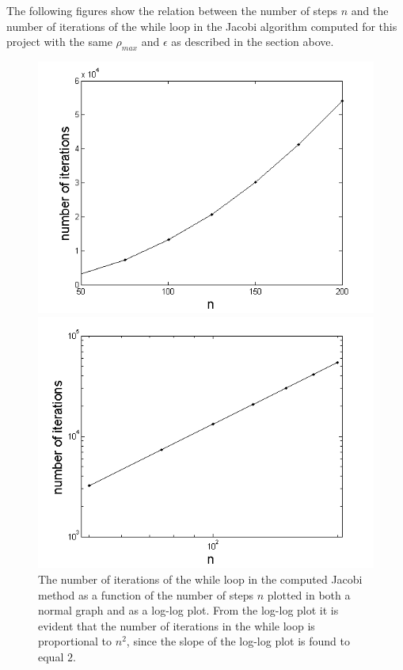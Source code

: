 The following figures show the relation between the number of steps $n$ and the number of iterations of the while loop in the Jacobi algorithm computed for this project with the same $\rho_{max}$ and $\epsilon$ as described in the section above.
\begin{figure}[H]
\centering
\begin{minipage}{.5\textwidth}
  \centering
  \includegraphics[width=1\linewidth]{figures/NumberOfIterations.png}
\end{minipage}%
\begin{minipage}{.5\textwidth}
  \centering
  \includegraphics[width=1\linewidth]{figures/NumberOfIterationsloglog.png}
\end{minipage}
\caption{The number of iterations of the while loop in the computed Jacobi method as a function of the number of steps $n$ plotted in both a normal graph and as a log-log plot. From the log-log plot it is evident that the number of iterations in the while loop is proportional to $n^2$, since the slope of the log-log plot is found to equal $2$.}
\label{fig:DependenceOnNumberOfIterations1}
\end{figure}
